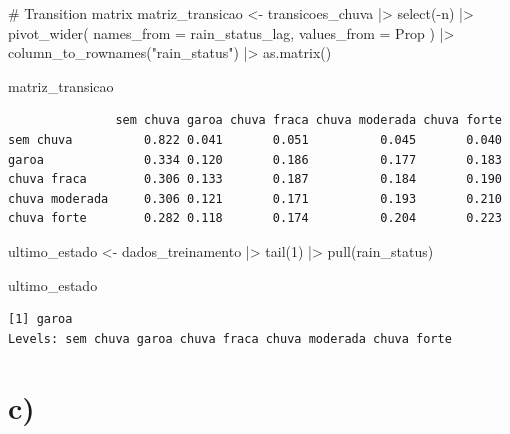 \documentclass[
  letterpaper,
  DIV=11,
  numbers=noendperiod]{scrreprt}
\newenvironment{Shaded}{\begin{snugshade}}{\end{snugshade}}
\newcommand{\AttributeTok}[1]{\textcolor[rgb]{0.40,0.45,0.13}{#1}}
\newcommand{\CommentTok}[1]{\textcolor[rgb]{0.37,0.37,0.37}{#1}}
\newcommand{\DecValTok}[1]{\textcolor[rgb]{0.68,0.00,0.00}{#1}}
\newcommand{\FunctionTok}[1]{\textcolor[rgb]{0.28,0.35,0.67}{#1}}
\newcommand{\NormalTok}[1]{\textcolor[rgb]{0.00,0.23,0.31}{#1}}
\newcommand{\OtherTok}[1]{\textcolor[rgb]{0.00,0.23,0.31}{#1}}
\newcommand{\SpecialCharTok}[1]{\textcolor[rgb]{0.37,0.37,0.37}{#1}}
\newcommand{\StringTok}[1]{\textcolor[rgb]{0.13,0.47,0.30}{#1}}
\begin{document}
\begin{Shaded}
\begin{Highlighting}[]
\CommentTok{\# Transition matrix}
\NormalTok{matriz\_transicao }\OtherTok{\textless{}{-}}
\NormalTok{    transicoes\_chuva }\SpecialCharTok{|\textgreater{}}
    \FunctionTok{select}\NormalTok{(}\SpecialCharTok{{-}}\NormalTok{n) }\SpecialCharTok{|\textgreater{}}
    \FunctionTok{pivot\_wider}\NormalTok{(}
        \AttributeTok{names\_from =}\NormalTok{ rain\_status\_lag,}
        \AttributeTok{values\_from =}\NormalTok{ Prop}
\NormalTok{    ) }\SpecialCharTok{|\textgreater{}}
    \FunctionTok{column\_to\_rownames}\NormalTok{(}\StringTok{"rain\_status"}\NormalTok{) }\SpecialCharTok{|\textgreater{}}
    \FunctionTok{as.matrix}\NormalTok{()}

\NormalTok{matriz\_transicao}
\end{Highlighting}
\end{Shaded}

\begin{verbatim}
               sem chuva garoa chuva fraca chuva moderada chuva forte
sem chuva          0.822 0.041       0.051          0.045       0.040
garoa              0.334 0.120       0.186          0.177       0.183
chuva fraca        0.306 0.133       0.187          0.184       0.190
chuva moderada     0.306 0.121       0.171          0.193       0.210
chuva forte        0.282 0.118       0.174          0.204       0.223
\end{verbatim}

\begin{Shaded}
\begin{Highlighting}[]
\NormalTok{ultimo\_estado }\OtherTok{\textless{}{-}}\NormalTok{ dados\_treinamento }\SpecialCharTok{|\textgreater{}}
    \FunctionTok{tail}\NormalTok{(}\DecValTok{1}\NormalTok{) }\SpecialCharTok{|\textgreater{}}
    \FunctionTok{pull}\NormalTok{(rain\_status)}

\NormalTok{ultimo\_estado}
\end{Highlighting}
\end{Shaded}

\begin{verbatim}
[1] garoa
Levels: sem chuva garoa chuva fraca chuva moderada chuva forte
\end{verbatim}

\hypertarget{c}{%
\section*{c)}\label{c}}
\end{document}
